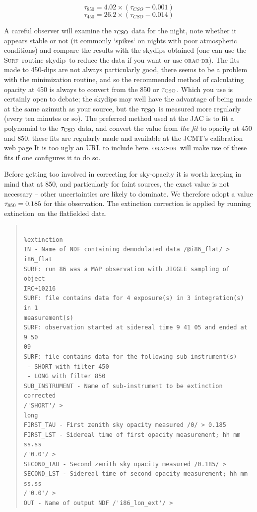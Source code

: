 \documentclass[twoside,11pt]{article}
\newenvironment{myquote}{\begin{quote}\begin{small}}{\end{small}\end{quote}}
\newcommand{\surf}{\xref{\textsc{Surf}}{sun216}{}}
\newcommand{\oracdr}{\xref{\textsc{orac-dr}}{sun231}{}}
\newcommand{\task}[1]{\textsf{#1}}
\newcommand{\skydip}{\xref{\task{skydip}}{sun216}{SKYDIP}}
\newcommand{\ext}{\xref{\task{extinction}}{sun216}{EXTINCTION}}
\newcommand{\htmladdnormallink}[2]{#1}
\newcommand{\xref}[3]{#1}
\renewcommand{\_}{\texttt{\symbol{95}}}
\begin{document}
\begin{equation}
\tau_{850} = 4.02 \times (\tau_{CSO} - 0.001)
\end{equation}
\begin{equation}
\tau_{450} = 26.2 \times (\tau_{CSO} - 0.014)
\end{equation}

A careful observer will examine the $\tau_{\rm CSO}$ data for the
night, note whether it appears stable or not (it commonly `spikes` on
nights with poor atmospheric conditions) and compare the results with
the skydips obtained (one can use the \surf\ routine \skydip\ to reduce
the data if you want or use \oracdr).  The fits made to 450-dips are
not always particularly good, there seems to be a problem with the
minimization routine, and so the recommended method of calculating
opacity at 450 is always to convert from the 850 or $\tau_{\rm CSO}$.
Which you use is certainly open to debate; the skydips may well have
the advantage of being made at the same azimuth as your source, but
the $\tau_{\rm CSO}$ is measured more regularly (every ten minutes or
so).  The preferred method used at the JAC is to fit a polynomial to
the $\tau_{\rm CSO}$ data, and convert the value from {\it the fit} to
opacity at 450 and 850, these fits are regularly made and available at
\htmladdnormallink{the JCMT's calibration web page}
{http://www.jach.hawaii.edu/JACpublic/JCMT/Continuum_observing/SCUBA/astronomy/calibration/fitscover.html}
It is too ugly an URL to include here. \oracdr\ will make use of these
fits if one configures it to do so.

Before getting too involved in correcting for sky-opacity it is worth
keeping in mind that at 850, and particularly for faint sources, the
exact value is not necessary -- other uncertainties are likely to
dominate. We therefore adopt a value $\tau_{\rm 850}=0.185$ for this
observation. The extinction correction is applied by running \ext\ on
the flatfielded data.

\begin{myquote}
\begin{verbatim}

%extinction
IN - Name of NDF containing demodulated data /@i86_flat/ > i86_flat
SURF: run 86 was a MAP observation with JIGGLE sampling of object
IRC+10216
SURF: file contains data for 4 exposure(s) in 3 integration(s) in 1
measurement(s)
SURF: observation started at sidereal time 9 41 05 and ended at 9 50
09
SURF: file contains data for the following sub-instrument(s)
 - SHORT with filter 450
 - LONG with filter 850
SUB_INSTRUMENT - Name of sub-instrument to be extinction corrected
/'SHORT'/ >
long
FIRST_TAU - First zenith sky opacity measured /0/ > 0.185
FIRST_LST - Sidereal time of first opacity measurement; hh mm ss.ss
/'0.0'/ >
SECOND_TAU - Second zenith sky opacity measured /0.185/ >
SECOND_LST - Sidereal time of second opacity measurement; hh mm ss.ss
/'0.0'/ >
OUT - Name of output NDF /'i86_lon_ext'/ >
\end{verbatim}
\end{myquote}
\end{document}
